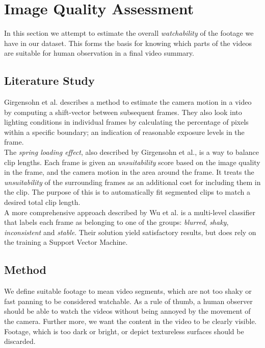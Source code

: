 %
\chapter{Image Quality Assessment}\label{chp:image_qual_ass}
%
In this section we attempt to estimate the overall \textit{watchability} of the footage we have in our dataset. This forms the basis for knowing which parts of the videos are suitable for human observation in a final video summary.
%
\section{Literature Study}
%
Girgensohn et al.\cite{Girgensohn:2000:SAH:354401.354415} describes a method to estimate the camera motion in a video by computing a shift-vector between subsequent frames. They also look into lighting conditions in individual frames by calculating the percentage of pixels within a specific boundary; an indication of reasonable exposure levels in the frame.\\
The \textit{spring loading effect}\cite{Girgensohn:2000:SAH:354401.354415}, also described by Girgensohn et al., is a way to balance clip lengths. Each frame is given an \textit{unsuitability} score based on the image quality in the frame, and the camera motion in the area around the frame. It treats the \textit{unsuitability} of the surrounding frames as an additional cost for including them in the clip. The purpose of this is to automatically fit segmented clips to match a desired total clip length.\\
A more comprehensive approach described by Wu et al.\cite{10.1109/ICME.2005.1521399} is a multi-level classifier that labels each frame as belonging to one of the groups: \textit{blurred}, \textit{shaky}, \textit{inconsistent} and \textit{stable}. Their solution yield satisfactory results, but does rely on the training a Support Vector Machine.
%
\section{Method}
%
We define suitable footage to mean video segments, which are not too shaky or fast panning to be considered watchable. As a rule of thumb, a human observer should be able to watch the videos without being annoyed by the movement of the camera. Further more, we want the content in the video to be clearly visible. Footage, which is too dark or bright, or depict textureless surfaces should be discarded.
%
